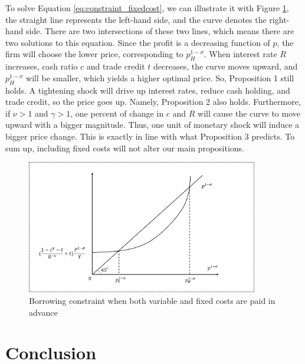 To solve Equation \ref{eq:constraint_fixedcost}, we can illustrate it with Figure \ref{fig: fixed_cost}, the straight line represents the left-hand side, and the curve denotes the right-hand side. There are two intersections of these two lines, which means there are two solutions to this equation. Since the profit is a decreasing function of $p$, the firm will choose the lower price, corresponding to $p_H^{1-\sigma}$. When interest rate $R$ increases, cash ratio $c$ and trade credit $t$ decreases, the curve moves upward, and $p_H^{1-\sigma}$ will be smaller, which yields a higher optimal price. So, Proposition 1 still holds. A tightening shock will drive up interest rates, reduce cash holding, and trade credit, so the price goes up. Namely, Proposition 2 also holds. Furthermore, if $\nu>1$ and $\gamma>1$, one percent of change in $c$ and $R$ will cause the curve to move upward with a bigger magnitude. Thus, one unit of monetary shock will induce a bigger price change. This is exactly in line with what Proposition 3 predicts. To sum up, including fixed costs will not alter our main propositions.

\begin{figure}[H]
     \centering
         \includegraphics[width=0.9\textwidth]{latex/drafts/pic/fixed_cost.png}
         \caption{\small Borrowing constraint when both variable and fixed costs are paid in advance}
         \label{fig: fixed_cost}
\end{figure}


\section{Conclusion}


